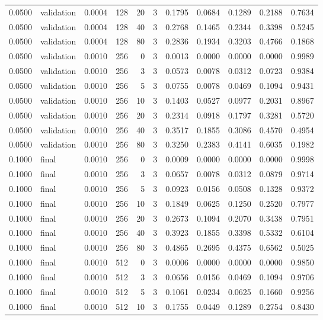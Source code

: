 \begin{tabular}{rlrrrrrrrrr}
0.0500 & validation & 0.0004 & 128 & 20 & 3 & 0.1795 & 0.0684 & 0.1289 & 0.2188 & 0.7634 \\
0.0500 & validation & 0.0004 & 128 & 40 & 3 & 0.2768 & 0.1465 & 0.2344 & 0.3398 & 0.5245 \\
0.0500 & validation & 0.0004 & 128 & 80 & 3 & 0.2836 & 0.1934 & 0.3203 & 0.4766 & 0.1868 \\
0.0500 & validation & 0.0010 & 256 & 0 & 3 & 0.0013 & 0.0000 & 0.0000 & 0.0000 & 0.9989 \\
0.0500 & validation & 0.0010 & 256 & 3 & 3 & 0.0573 & 0.0078 & 0.0312 & 0.0723 & 0.9384 \\
0.0500 & validation & 0.0010 & 256 & 5 & 3 & 0.0755 & 0.0078 & 0.0469 & 0.1094 & 0.9431 \\
0.0500 & validation & 0.0010 & 256 & 10 & 3 & 0.1403 & 0.0527 & 0.0977 & 0.2031 & 0.8967 \\
0.0500 & validation & 0.0010 & 256 & 20 & 3 & 0.2314 & 0.0918 & 0.1797 & 0.3281 & 0.5720 \\
0.0500 & validation & 0.0010 & 256 & 40 & 3 & 0.3517 & 0.1855 & 0.3086 & 0.4570 & 0.4954 \\
0.0500 & validation & 0.0010 & 256 & 80 & 3 & 0.3250 & 0.2383 & 0.4141 & 0.6035 & 0.1982 \\
0.1000 & final & 0.0010 & 256 & 0 & 3 & 0.0009 & 0.0000 & 0.0000 & 0.0000 & 0.9998 \\
0.1000 & final & 0.0010 & 256 & 3 & 3 & 0.0657 & 0.0078 & 0.0312 & 0.0879 & 0.9714 \\
0.1000 & final & 0.0010 & 256 & 5 & 3 & 0.0923 & 0.0156 & 0.0508 & 0.1328 & 0.9372 \\
0.1000 & final & 0.0010 & 256 & 10 & 3 & 0.1849 & 0.0625 & 0.1250 & 0.2520 & 0.7977 \\
0.1000 & final & 0.0010 & 256 & 20 & 3 & 0.2673 & 0.1094 & 0.2070 & 0.3438 & 0.7951 \\
0.1000 & final & 0.0010 & 256 & 40 & 3 & 0.3923 & 0.1855 & 0.3398 & 0.5332 & 0.6104 \\
0.1000 & final & 0.0010 & 256 & 80 & 3 & 0.4865 & 0.2695 & 0.4375 & 0.6562 & 0.5025 \\
0.1000 & final & 0.0010 & 512 & 0 & 3 & 0.0006 & 0.0000 & 0.0000 & 0.0000 & 0.9850 \\
0.1000 & final & 0.0010 & 512 & 3 & 3 & 0.0656 & 0.0156 & 0.0469 & 0.1094 & 0.9706 \\
0.1000 & final & 0.0010 & 512 & 5 & 3 & 0.1061 & 0.0234 & 0.0625 & 0.1660 & 0.9256 \\
0.1000 & final & 0.0010 & 512 & 10 & 3 & 0.1755 & 0.0449 & 0.1289 & 0.2754 & 0.8430 \\

\end{tabular}
